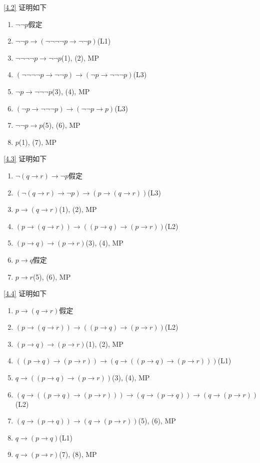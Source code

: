 \documentclass[boxes]{homework}
\begin{document}
\begin{solution}
    \ref{4.2}
    证明如下
    \begin{enumerate}[label = (\arabic*)]\label{sol:4.1}
        \item $\lnot\lnot p$\hfill 假定
        \item $\lnot\lnot p\to (\lnot\lnot\lnot\lnot p\to \lnot\lnot p)$\hfill (L1)
        \item $\lnot\lnot\lnot\lnot p\to \lnot\lnot p$\hfill (1), (2), MP
        \item $(\lnot\lnot\lnot\lnot p\to \lnot\lnot p)\to (\lnot p\to \lnot\lnot\lnot p)$\hfill (L3)
        \item $\lnot p\to \lnot\lnot\lnot p$\hfill (3), (4), MP
        \item $(\lnot p\to \lnot\lnot\lnot p)\to (\lnot\lnot p\to p)$\hfill (L3)
        \item $\lnot\lnot p\to p$\hfill (5), (6), MP
        \item $p$\hfill (1), (7), MP
    \end{enumerate}
    \ref{4.3}
    证明如下
    \begin{enumerate}[label = (\arabic*)]
        \item $\lnot (q\to r)\to \lnot p$\hfill 假定
        \item $(\lnot (q\to r)\to \lnot p)\to(p\to(q\to r))$\hfill (L3)
        \item $p\to(q\to r)$\hfill (1), (2), MP
        \item $(p\to(q\to r))\to((p\to q)\to (p\to r))$\hfill (L2)
        \item $(p\to q)\to (p\to r)$\hfill (3), (4), MP
        \item $p\to q$\hfill 假定
        \item $p\to r$\hfill (5), (6), MP
    \end{enumerate}
    \ref{4.4}
    证明如下
    \begin{enumerate}[label = (\arabic*)]
        \item $p\to (q\to r)$\hfill 假定
        \item $(p\to (q\to r))\to((p\to q)\to(p\to r))$\hfill (L2)
        \item $(p\to q)\to(p\to r)$\hfill (1), (2), MP
        \item $((p\to q)\to(p\to r))\to(q\to ((p\to q)\to (p\to r)))$\hfill (L1)
        \item $q\to ((p\to q)\to (p\to r))$\hfill (3), (4), MP
        \item $(q\to ((p\to q)\to (p\to r)))\to (q\to (p\to q))\to (q\to (p\to r))$ \hfill (L2)
        \item $(q\to (p\to q))\to (q\to (p\to r))$\hfill (5), (6), MP
        \item $q\to (p\to q)$\hfill (L1)
        \item $q\to (p\to r)$\hfill (7), (8), MP
    \end{enumerate}
\end{solution}
\end{document}
